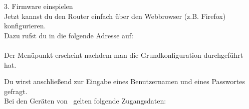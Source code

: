 



{\Large 3. Firmware einspielen} \\

Jetzt kannst du den Router einfach über den Webbrowser (z.B. Firefox) konfigurieren.\\ 
Dazu rufst du in die folgende Adresse auf: \\

 \\

Der Menüpunkt  erscheint nachdem man die Grundkonfiguration durchgeführt hat.

Du wirst anschließend zur Eingabe eines Benutzernamen und eines Passwortes gefragt. \\
Bei den Geräten von \printVendor\ gelten folgende Zugangsdaten:

\\%



























